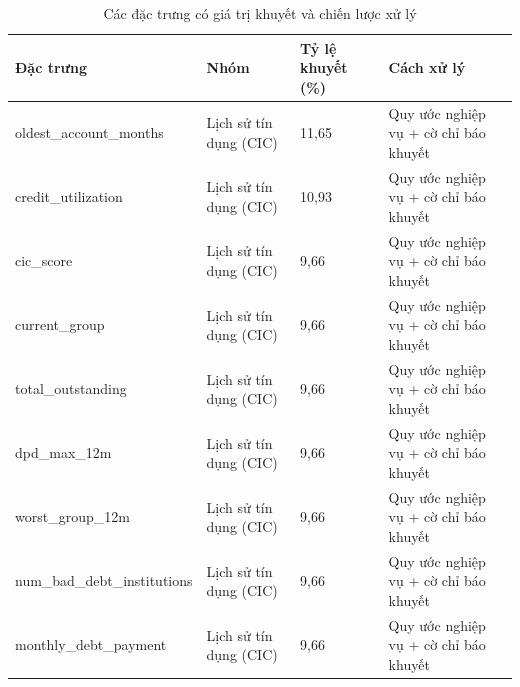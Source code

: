 \begin{table}[!htbp]
\centering
\caption{Các đặc trưng có giá trị khuyết và chiến lược xử lý}
\label{tab:missing}
\small
\setlength{\tabcolsep}{5.0pt}
\begin{tabular}{@{}L{4.4cm}L{2.0cm}R{2.4cm}L{5.4cm}@{}}
\toprule
\textbf{Đặc trưng} & \textbf{Nhóm} & \textbf{Tỷ lệ khuyết (\%)} & \textbf{Cách xử lý} \\
\midrule
oldest\_\allowbreak account\_\allowbreak months & Lịch sử tín dụng (CIC) & 11,65 & Quy ước nghiệp vụ + cờ chỉ báo khuyết \\
credit\_\allowbreak utilization & Lịch sử tín dụng (CIC) & 10,93 & Quy ước nghiệp vụ + cờ chỉ báo khuyết \\
cic\_score & Lịch sử tín dụng (CIC) & 9,66 & Quy ước nghiệp vụ + cờ chỉ báo khuyết \\
current\_\allowbreak group & Lịch sử tín dụng (CIC) & 9,66 & Quy ước nghiệp vụ + cờ chỉ báo khuyết \\
total\_\allowbreak outstanding & Lịch sử tín dụng (CIC) & 9,66 & Quy ước nghiệp vụ + cờ chỉ báo khuyết \\
dpd\_\allowbreak max\_\allowbreak 12m & Lịch sử tín dụng (CIC) & 9,66 & Quy ước nghiệp vụ + cờ chỉ báo khuyết \\
worst\_\allowbreak group\_\allowbreak 12m & Lịch sử tín dụng (CIC) & 9,66 & Quy ước nghiệp vụ + cờ chỉ báo khuyết \\
num\_\allowbreak bad\_\allowbreak debt\_\allowbreak institutions & Lịch sử tín dụng (CIC) & 9,66 & Quy ước nghiệp vụ + cờ chỉ báo khuyết \\
monthly\_\allowbreak debt\_\allowbreak payment & Lịch sử tín dụng (CIC) & 9,66 & Quy ước nghiệp vụ + cờ chỉ báo khuyết \\
\bottomrule
\end{tabular}
\end{table}
